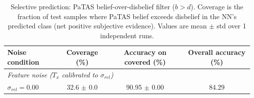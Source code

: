 \begin{table}[ht]
\centering
\caption{Selective prediction: PaTAS belief-over-disbelief filter ($b > d$). Coverage is the fraction of test samples where PaTAS belief exceeds disbelief in the NN's predicted class (net positive subjective evidence). Values are mean $\pm$ std over 1 independent runs.}
\label{tab:threshold-b-gt-d}
\begin{tabular}{lccc}
\toprule
Noise condition & Coverage (\%) & Accuracy on covered (\%) & Overall accuracy (\%) \\
\midrule
\multicolumn{4}{l}{\textit{Feature noise ($T_x$ calibrated to $\sigma_{rel}$)}} \\
$\sigma_{rel}=0.00$ & 32.6 $\pm$ 0.0 & 90.95 $\pm$ 0.00 & 84.29 \\
\bottomrule
\end{tabular}
\end{table}